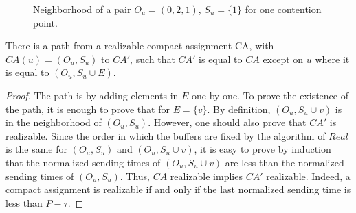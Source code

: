 \begin{figure}
\begin{center}


 \caption{Neighborhood of a pair $O_u = (0,2,1)$, $S_u = \{1\}$ for one contention point.}

\label{fig:partialtreeneigh}
\end{center}
\end{figure}

\begin{lemma}\label{lemma:path}
There is a path from a realizable compact assignment CA, with $CA(u) = (O_u,S_u)$ to $CA'$, such that 
$CA'$ is equal to $CA$ except on $u$ where it is equal to $(O_u,S_u \cup E)$.  
\end{lemma}
\begin{proof}
The path is by adding elements in $E$ one by one. 
 To prove the existence of the path, it is enough to prove that for  $E = \{v\}$. By definition, $(O_u,S_u \cup{v})$ is in the neighborhood of $(O_u,S_u)$. However, one should also prove that $CA'$ is realizable.
  Since the order in which the buffers are fixed by the algorithm of $Real$ is the same for $(O_u,S_u)$ and $(O_u,S_u \cup{v})$, it is easy to prove by induction that the normalized sending times of $(O_u,S_u \cup{v})$ are less than the normalized sending times of $(O_u,S_u)$. Thus, $CA$ realizable implies $CA'$ realizable. Indeed, 
a compact assignment is realizable if and only if the last normalized sending time is less than $P - \tau$.
\end{proof}



